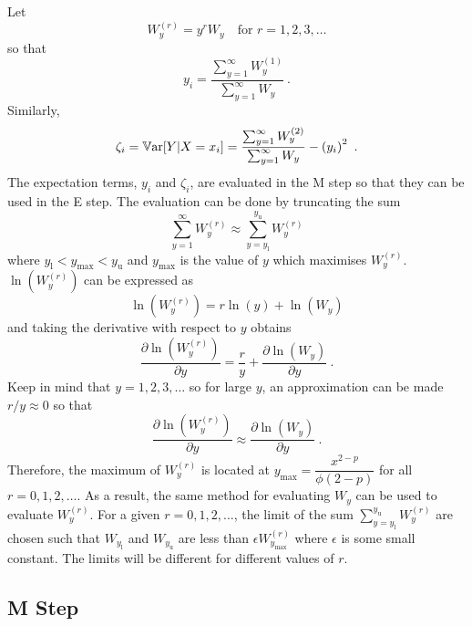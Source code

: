 Let
\begin{equation}
  W_y^{(r)} = y^r W_y \quad \text{for }r=1,2,3,\dotsc
\end{equation}
so that
\begin{equation}
  y_i = \frac{\sum_{y=1}^\infty W^{(1)}_y}{\sum_{y=1}^\infty W_y} \ .
\end{equation}
Similarly,
\begin{equation}
  \zeta_i = \operatorname{\mathbb{V}ar}[Y|X=x_i] = \frac{\sum_{y=1}^\infty W^{(2)}_y}{\sum_{y=1}^\infty W_y} - \left(y_i\right)^2
  \ .
\end{equation}
The expectation terms, $y_i$ and $\zeta_i$, are evaluated in the M step so that they can be used in the E step. The evaluation can be done by truncating the sum
\begin{equation}
  \sum_{y=1}^\infty W^{(r)}_y \approx \sum_{y=y_\text{l}}^{y_\text{u}} W^{(r)}_y
\end{equation}
where $y_\text{l}<y_\text{max}<y_\text{u}$ and $y_\text{max}$ is the value of $y$ which maximises $W_y^{(r)}$. $\ln(W^{(r)}_y)$ can be expressed as
\begin{equation}
  \ln\left(W_y^{(r)}\right)=r\ln(y)+\ln(W_y)
\end{equation}
and taking the derivative with respect to $y$ obtains
\begin{equation}
  \frac{\partial \ln(W_y^{(r)})}{\partial y} = \frac{r}{y } + \frac{\partial \ln(W_y)}{\partial y}
  \ .
\end{equation}
Keep in mind that $y=1,2,3,\dotsc$ so for large $y$, an approximation can be made $r/y\approx 0$ so that
\begin{equation}
  \frac{\partial \ln(W_y^{(r)})}{\partial y} \approx \frac{\partial \ln(W_y)}{\partial y}
  \ .
\end{equation}
Therefore, the maximum of $W_y^{(r)}$ is located at $y_\text{max}=\dfrac{x^{2-p}}{\phi(2-p)}$ for all $r=0,1,2,\dotsc$. As a result, the same method for evaluating $W_y$ can be used to evaluate $W_y^{(r)}$. For a given $r=0,1,2,\dotsc$, the limit of the sum $\sum_{y=y_\text{l}}^{y_\text{u}} W^{(r)}_y$ are chosen such that $W_{y_\text{l}}$ and $W_{y_\text{u}}$ are less than $\epsilon W_{y_\text{max}}^{(r)}$ where $\epsilon$ is some small constant. The limits will be different for different values of $r$.

\subsection{M Step}

